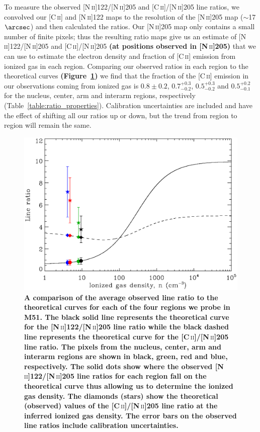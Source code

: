 \documentclass[preprint2]{aastex}
\begin{document}
To measure the observed [N\,\textsc{ii}]122/[N\,\textsc{ii}]205 and [C\,\textsc{ii}]/[N\,\textsc{ii}]205 line ratios, we convolved our [C\,\textsc{ii}] and [N\,\textsc{ii}]122 maps to the resolution of the [N\,\textsc{ii}]205 map ($\sim$17$\arcsec$) and then calculated the ratios.  Our [N\,\textsc{ii}]205 map only contains a small number of finite pixels; thus the resulting ratio maps give us an estimate of [N\,\textsc{ii}]122/[N\,\textsc{ii}]205 and [C\,\textsc{ii}]/[N\,\textsc{ii}]205 \textbf{(at positions observed in [N\,}\textsc{ii}\textbf{]205)} that we can use to estimate the electron density and fraction of [C\,\textsc{ii}] emission from ionized gas in each region.  Comparing our observed ratios in each region to the theoretical curves \textbf{(Figure~\ref{fig:line_ratio_compare})} we find that the fraction of the [C\,\textsc{ii}] emission in our observations coming from ionized gas is $0.8 \pm 0.2$, $0.7^{+0.3}_{-0.2}$, $0.5^{+0.3}_{-0.2}$ and $0.5^{+0.2}_{-0.1}$ for the nucleus, center, arm and interarm regions, respectively (Table~\ref{table:ratio_properties}).  Calibration uncertainties are included and have the effect of shifting all our ratios up or down, but the trend from region to region will remain the same.

\begin{figure}
\includegraphics[width=\columnwidth]{Figure5}
\caption{\textbf{A comparison of the average observed line ratio to the theoretical curves for each of the four regions we probe in M51.  The black solid line represents the theoretical curve for the [N\,}\textsc{ii}\textbf{]122/[N\,}\textsc{ii}\textbf{]205 line ratio while the black dashed line represents the theoretical curve for the [C\,}\textsc{ii}\textbf{]/[N\,}\textsc{ii}\textbf{]205 line ratio.  The pixels from the nucleus, center, arm and interarm regions are shown in black, green, red and blue, respectively.  The solid dots show where the observed [N\,}\textsc{ii}\textbf{]122/[N\,}\textsc{ii}\textbf{]205 line ratios for each region fall on the theoretical curve thus allowing us to determine the ionized gas density.  The diamonds (stars) show the theoretical (observed) values of the [C\,}\textsc{ii}\textbf{]/[N\,}\textsc{ii}\textbf{]205 line ratio at the inferred ionized gas density.  The error bars on the observed line ratios include calibration uncertainties.}}
\label{fig:line_ratio_compare}
\end{figure}
\end{document}
